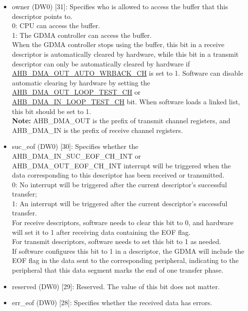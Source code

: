 \documentclass[main\_\_EN.tex]{subfiles}
\begin{document}
\begin{itemize}
    \item owner (DW0) [31]: Specifies who is allowed to access the buffer that this descriptor points to.\\
    0: CPU can access the buffer. \\
    1: The GDMA controller can access the buffer.\\
    When the GDMA controller stops using the buffer, this bit in a receive descriptor is automatically cleared by hardware, while this bit in a transmit descriptor can only be automatically cleared by hardware if \hyperref[fielddesc:AHBDMAOUTAUTOWRBACKCHN]{AHB\_DMA\_OUT\_AUTO\_WRBACK\_CH} is set to 1. Software can disable automatic clearing by hardware by setting the \hyperref[fielddesc:AHBDMAOUTLOOPTESTCHN]{AHB\_DMA\_OUT\_LOOP\_TEST\_CH} or \hyperref[fielddesc:AHBDMAINLOOPTESTCHN]{AHB\_DMA\_IN\_LOOP\_TEST\_CH} bit. When software loads a linked list, this bit should be set to 1.
    \\{\bfseries Note:} AHB\_DMA\_OUT is the prefix of transmit channel registers, and AHB\_DMA\_IN is the prefix of receive channel registers.
    \item suc\_eof (DW0) [30]: Specifies whether the AHB\_DMA\_IN\_SUC\_EOF\_CH\_INT or AHB\_DMA\_OUT\_EOF\_CH\_INT interrupt will be triggered when the data corresponding to this descriptor has been received or transmitted.\\
    0: No interrupt will be triggered after the current descriptor's successful transfer;\\
    1: An interrupt will be triggered after the current descriptor's successful transfer.\\
    For receive descriptors, software needs to clear this bit to 0, and hardware will set it to 1 after receiving data containing the EOF flag.\\
    For transmit descriptors, software needs to set this bit to 1 as needed.\\
    If software configures this bit to 1 in a descriptor, the GDMA will include the EOF flag in the data sent to the corresponding peripheral, indicating to the peripheral that this data segment marks the end of one transfer phase.
    \item reserved (DW0) [29]: Reserved. The value of this bit does not matter.
    \item err\_eof (DW0) [28]: Specifies whether the received data has errors.\\

\end{itemize}
\end{document}
